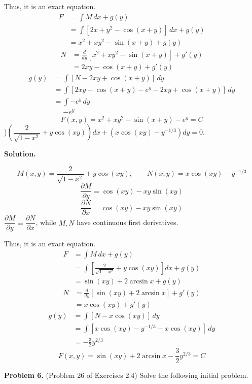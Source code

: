 \documentclass[11pt,a4paper]{article}
\begin{document}
Thus, it is an exact equation.
\[
\begin{aligned}
F&=\int M\,dx+g(y)\\
 &=\int[2x+y^2-\cos(x+y)]\,dx+g(y)\\
 &=x^2+xy^2-\sin(x+y)+g(y)
\end{aligned}
\]
\[
\begin{aligned}
N&=\frac{d}{dy}[x^2+xy^2-\sin(x+y)]+g'(y)\\
 &=2xy-\cos(x+y)+g'(y)
\end{aligned}
\]
\[
\begin{aligned}
g(y)&=\int[N-2xy+\cos(x+y)]\,dy\\
    &=\int[2xy-\cos(x+y)-e^y-2xy+\cos(x+y)]\,dy\\
    &=\int -e^y\,dy\\
    &=-e^y
\end{aligned}
\]
\[
F(x,y)=x^2+xy^2-\sin(x+y)-e^y=C
\]
)$\left(\dfrac{2}{\sqrt{1-x^2}}+y\cos (xy)\right)dx+\left(x\cos (xy)-y^{-1/3}\right)dy=0$.
\medskip
\par\noindent
\textbf{Solution.}\par
\[
M(x,y)=\frac{2}{\sqrt{1-x^2}}+y\cos(xy),\qquad
N(x,y)=x\cos(xy)-y^{-1/3}
\]
\[
\frac{\partial M}{\partial y}=\cos(xy)-xy\sin(xy)
\]
\[
\frac{\partial N}{\partial x}=\cos(xy)-xy\sin(xy)
\]
$\dfrac{\partial M}{\partial y}=\dfrac{\partial N}{\partial x}$,
while $M,N$ have continuous first derivatives.

Thus, it is an exact equation.
\[
\begin{aligned}
F&=\int M\,dx+g(y)\\
 &=\int\left[\frac{2}{\sqrt{1-x^2}}+y\cos(xy)\right]dx+g(y)\\
 &=\sin(xy)+2\arcsin x+g(y)
\end{aligned}
\]
\[
\begin{aligned}
N&=\frac{d}{dy}[\sin(xy)+2\arcsin x]+g'(y)\\
 &=x\cos(xy)+g'(y)
\end{aligned}
\]
\[
\begin{aligned}
g(y)&=\int[N-x\cos(xy)]\,dy\\
    &=\int[x\cos(xy)-y^{-1/3}-x\cos(xy)]\,dy\\
    &=-\frac{3}{2}y^{2/3}
\end{aligned}
\]
\[
F(x,y)=\sin(xy)+2\arcsin x-\frac{3}{2}y^{2/3}=C
\]
\medskip


\bigskip
\noindent
{\bf Problem 6.}  (Problem 26 of Exercises 2.4)
Solve the following initial problem.
\end{document}
